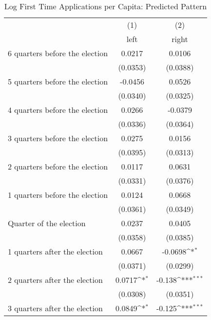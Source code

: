\begin{table}[htbp]\centering
\def\sym#1{\ifmmode^{#1}\else\(^{#1}\)\fi}
\caption{Log First Time Applications per Capita: Predicted Pattern}
\begin{tabular}{l*{2}{c}}
\hline\hline
                    &\multicolumn{1}{c}{(1)}&\multicolumn{1}{c}{(2)}\\
                    &\multicolumn{1}{c}{left}&\multicolumn{1}{c}{right}\\
\hline
 6 quarters before the election&      0.0217         &      0.0106         \\
                    &    (0.0353)         &    (0.0388)         \\
[1em]
 5 quarters before the election&     -0.0456         &      0.0526         \\
                    &    (0.0340)         &    (0.0325)         \\
[1em]
 4 quarters before the election&      0.0266         &     -0.0379         \\
                    &    (0.0336)         &    (0.0364)         \\
[1em]
 3 quarters before the election&      0.0275         &      0.0156         \\
                    &    (0.0395)         &    (0.0313)         \\
[1em]
 2 quarters before the election&      0.0117         &      0.0631         \\
                    &    (0.0331)         &    (0.0376)         \\
[1em]
 1 quarters before the election&      0.0124         &      0.0668         \\
                    &    (0.0361)         &    (0.0349)         \\
[1em]
Quarter of the election&      0.0237         &      0.0405         \\
                    &    (0.0358)         &    (0.0385)         \\
[1em]
 1 quarters after the election&      0.0667         &     -0.0698\sym{*}  \\
                    &    (0.0371)         &    (0.0299)         \\
[1em]
 2 quarters after the election&      0.0717\sym{*}  &      -0.138\sym{***}\\
                    &    (0.0308)         &    (0.0351)         \\
[1em]
 3 quarters after the election&      0.0849\sym{*}  &      -0.125\sym{***}\\

\end{tabular}
\end{table}
